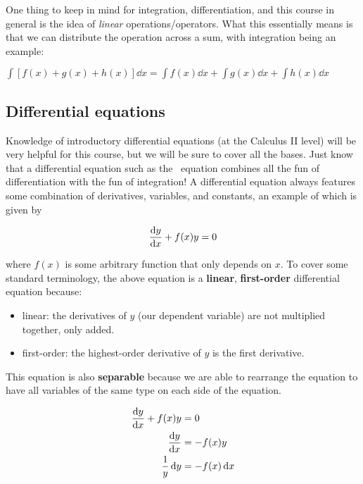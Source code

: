One thing to keep in mind for integration, differentiation, and this course in general is the idea of \emph{linear} operations/operators. 
What this essentially means is that we can distribute the operation across a sum, with integration being an example:

\begin{tcolorbox}[title=Linear operations---integration example]
	$\displaystyle\int \left[ f(x) + g(x) + h(x) \right]\dd{x} = \displaystyle\int f(x)\dd{x} + \displaystyle\int g(x)\dd{x} + \displaystyle\int h(x)\dd{x}$
\end{tcolorbox}



\subsection{Differential equations}

Knowledge of introductory differential equations (at the Calculus II level) will be very helpful for this course, but we will be sure to cover all the bases. 
Just know that a differential equation such as the \Sch\ equation combines all the fun of differentiation with the fun of integration! 
A differential equation always features some combination of derivatives, variables, and constants, an example of which is given by 

\[ \dv{y}{x} + f(x)y = 0 \] 

\noindent where $f(x)$ is some arbitrary function that only depends on $x$. 
To cover some standard terminology, the above equation is a \textbf{linear}, \textbf{first-order} differential equation because:

\begin{itemize}
	\item linear: the derivatives of $y$ (our dependent variable) are not multiplied together, only added.
	
	\item first-order: the highest-order derivative of $y$ is the first derivative. 
\end{itemize}

This equation is also \textbf{separable} because we are able to rearrange the equation to have all variables of the same type on each side of the equation.

\begin{align*}
	\dv{y}{x} + f(x)y &= 0 \\
	\dv{y}{x} &= -f(x)y \\
	\frac{1}{y}\dd{y} &= -f(x)\dd{x}
\end{align*}

